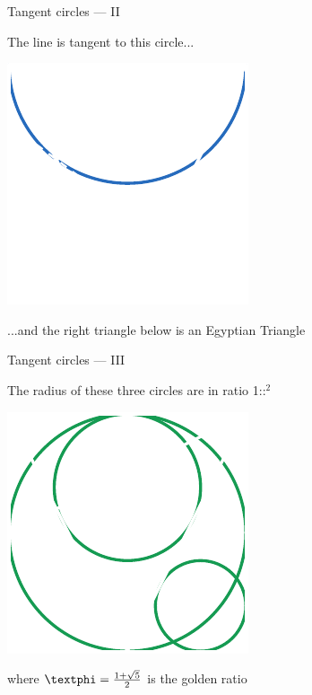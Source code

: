 \documentclass[14pt]{beamer}
\begin{document}

    \begin{frame}{Tangent circles --- II}
        \begin{center}
            The line is tangent to this circle...
        \end{center}
        \hspace{6.18em} \includegraphics[scale=1.0]{figures/figure019e.pdf} \\
        \begin{center}
             ...and the right triangle below is an Egyptian Triangle
        \end{center}
    \end{frame}


    \begin{frame}{Tangent circles --- III}
        \begin{center}
            The radius of these three circles are in ratio 1:\textphi:\textphi$^2$
        \end{center}\medskip
        \hspace{6.18em} \includegraphics[scale=1.0]{figures/figure019f.pdf} \\
        \begin{center}
             where $\text{\textphi} =\tfrac{1+\sqrt{5}}{2}$ is the golden ratio
        \end{center}
    \end{frame}
\end{document}
